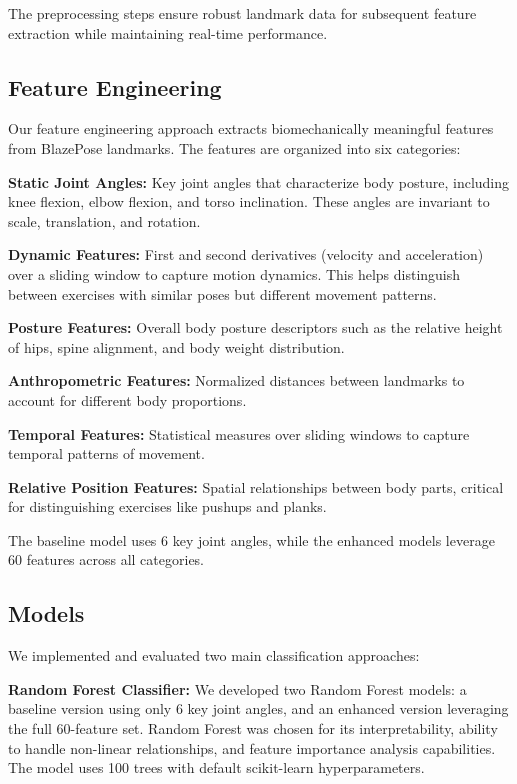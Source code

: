 \documentclass[conference]{IEEEtran}
\begin{document}
The preprocessing steps ensure robust landmark data for subsequent feature extraction while maintaining real-time performance.

\subsection{Feature Engineering}
Our feature engineering approach extracts biomechanically meaningful features from BlazePose landmarks. The features are organized into six categories:

\textbf{Static Joint Angles:} Key joint angles that characterize body posture, including knee flexion, elbow flexion, and torso inclination. These angles are invariant to scale, translation, and rotation.

\textbf{Dynamic Features:} First and second derivatives (velocity and acceleration) over a sliding window to capture motion dynamics. This helps distinguish between exercises with similar poses but different movement patterns.

\textbf{Posture Features:} Overall body posture descriptors such as the relative height of hips, spine alignment, and body weight distribution.

\textbf{Anthropometric Features:} Normalized distances between landmarks to account for different body proportions.

\textbf{Temporal Features:} Statistical measures over sliding windows to capture temporal patterns of movement.

\textbf{Relative Position Features:} Spatial relationships between body parts, critical for distinguishing exercises like pushups and planks.

The baseline model uses 6 key joint angles, while the enhanced models leverage 60 features across all categories.

\subsection{Models}
We implemented and evaluated two main classification approaches:

\textbf{Random Forest Classifier:} We developed two Random Forest models: a baseline version using only 6 key joint angles, and an enhanced version leveraging the full 60-feature set. Random Forest was chosen for its interpretability, ability to handle non-linear relationships, and feature importance analysis capabilities. The model uses 100 trees with default scikit-learn hyperparameters.
\end{document}
